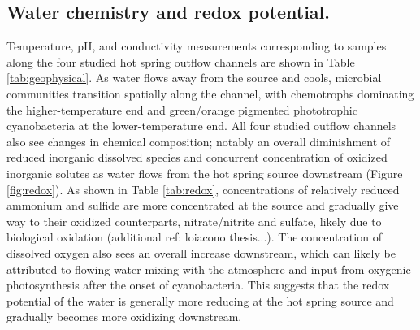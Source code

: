 \subsection{Water chemistry and redox potential.} Temperature, pH, and conductivity measurements corresponding to samples along the four studied hot spring outflow channels are shown in Table \ref{tab:geophysical}. As water flows away from the source and cools, microbial communities transition spatially along the channel, with chemotrophs dominating the higher-temperature end and green/orange pigmented phototrophic cyanobacteria at the lower-temperature end. All four studied outflow channels also see changes in chemical composition; notably an overall diminishment of reduced inorganic dissolved species and concurrent concentration of oxidized inorganic solutes as water flows from the hot spring source downstream (Figure \ref{fig:redox}). As shown in Table \ref{tab:redox}, concentrations of relatively reduced ammonium and sulfide are more concentrated at the source and gradually give way to their oxidized counterparts, nitrate/nitrite and sulfate, likely due to biological oxidation \citep{cox2011transition, loiacono2012evidence} (additional ref: loiacono thesis...). The concentration of dissolved oxygen also sees an overall increase downstream, which can likely be attributed to flowing water mixing with the atmosphere and input from oxygenic photosynthesis after the onset of cyanobacteria. This suggests that the redox potential of the water is generally more reducing at the hot spring source and gradually becomes more oxidizing downstream. 


